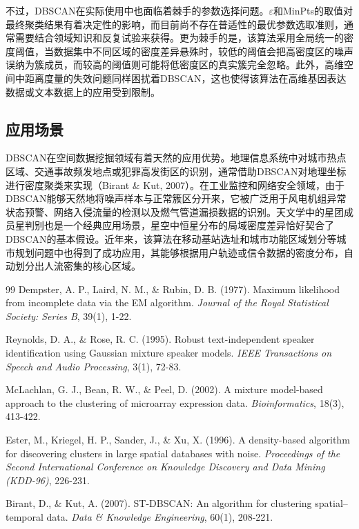\documentclass{article}
\begin{document}
不过，DBSCAN在实际使用中也面临着棘手的参数选择问题。$\varepsilon$和MinPts的取值对最终聚类结果有着决定性的影响，而目前尚不存在普适性的最优参数选取准则，通常需要结合领域知识和反复试验来获得。更为棘手的是，该算法采用全局统一的密度阈值，当数据集中不同区域的密度差异悬殊时，较低的阈值会把高密度区的噪声误纳为簇成员，而较高的阈值则可能将低密度区的真实簇完全忽略。此外，高维空间中距离度量的失效问题同样困扰着DBSCAN，这也使得该算法在高维基因表达数据或文本数据上的应用受到限制。

\subsection{应用场景}

DBSCAN在空间数据挖掘领域有着天然的应用优势。地理信息系统中对城市热点区域、交通事故频发地点或犯罪高发街区的识别，通常借助DBSCAN对地理坐标进行密度聚类来实现（Birant \& Kut, 2007）。在工业监控和网络安全领域，由于DBSCAN能够天然地将噪声样本与正常簇区分开来，它被广泛用于风电机组异常状态预警、网络入侵流量的检测以及燃气管道漏损数据的识别。天文学中的星团成员星判别也是一个经典应用场景，星空中恒星分布的局域密度差异恰好契合了DBSCAN的基本假设。近年来，该算法在移动基站选址和城市功能区域划分等城市规划问题中也得到了成功应用，其能够根据用户轨迹或信令数据的密度分布，自动划分出人流密集的核心区域。

\newpage
\begin{thebibliography}{99}
 Dempster, A. P., Laird, N. M., \& Rubin, D. B. (1977). Maximum likelihood from incomplete data via the EM algorithm. \textit{Journal of the Royal Statistical Society: Series B}, 39(1), 1-22.

 Reynolds, D. A., \& Rose, R. C. (1995). Robust text-independent speaker identification using Gaussian mixture speaker models. \textit{IEEE Transactions on Speech and Audio Processing}, 3(1), 72-83.

 McLachlan, G. J., Bean, R. W., \& Peel, D. (2002). A mixture model-based approach to the clustering of microarray expression data. \textit{Bioinformatics}, 18(3), 413-422.

 Ester, M., Kriegel, H. P., Sander, J., \& Xu, X. (1996). A density-based algorithm for discovering clusters in large spatial databases with noise. \textit{Proceedings of the Second International Conference on Knowledge Discovery and Data Mining (KDD-96)}, 226-231.

 Birant, D., \& Kut, A. (2007). ST-DBSCAN: An algorithm for clustering spatial–temporal data. \textit{Data \& Knowledge Engineering}, 60(1), 208-221.
\end{thebibliography}
\end{document}
